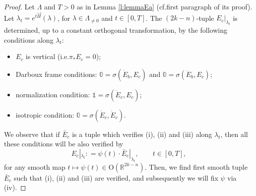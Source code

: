 \documentclass[10pt,a4paper]{amsart}
\newcommand{\R}{\mathbb{R}} %
\begin{document}
\begin{proof}
Let $\Lambda$ and $T>0$ as in Lemma \ref{l:lemmaEa} (cf.\@ first paragraph of its proof). Let $\lambda_t = e^{t\vec{H}}(\lambda)$, for $\lambda \in \Lambda_{\neq 0}$ and $t\in [0,T]$. The $(2k-n)$-tuple $E_c|_{\lambda_t}$ is determined, up to a constant orthogonal transformation, by the following conditions along $\lambda_t$:
\begin{itemize}
\item[(i)] $E_c$ is vertical (i.e.\@ $\pi_* E_c =0$);
\item[(ii)] Darboux frame conditions: $\mathbb{0}=\sigma(\dot{E}_b,E_c)$ and $\mathbb{0}=\sigma(\ddot{E}_b,E_c)$;
\item[(iii)] normalization condition: $\mathbb{1} = \sigma(\dot{E}_c,E_c)$;
\item[(iv)] isotropic condition: $\mathbb{0}=\sigma(\dot{E}_c,\dot{E}_c)$.
\end{itemize}
We observe that if $\bar{E}_c$ is a tuple which verifies (i), (ii) and (iii) along $\lambda_t$, then all these conditions will be also verified by
\begin{equation}
E_c|_{\lambda_t} : = \psi(t)\cdot \bar{E}_c|_{\lambda_t}, \qquad t\in [0,T],
\end{equation}
for any smooth map $t\mapsto \psi(t) \in \mathrm{O}(\R^{2k-n})$. Then, we find first smooth tuple $\bar{E}_c$ such that (i), (ii) and (iii) are verified, and subsequently we will fix $\psi$ via (iv). 


\end{proof}
\end{document}
